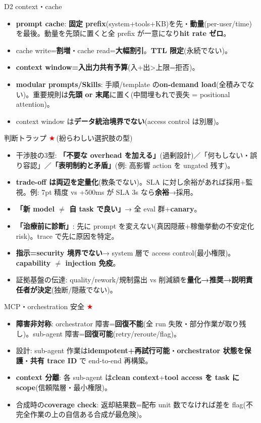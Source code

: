 \documentclass[10pt,a4paper]{article}
\newcommand{\R}[1]{\textcolor{cred}{\textbf{#1}}}
\newcommand{\B}[1]{\textcolor{cblue}{\textbf{#1}}}
\newcommand{\stc}{\textcolor{red}{\ensuremath{\bigstar}}\,}
\begin{document}
\begin{minipage}[t]{0.333\textwidth}

\begin{boxblue}{D2 context・cache}
\begin{itemize}
\item \R{prompt cache}: \B{固定 prefix}(system+tools+KB)を先・\B{動量}(per-user/time)を最後。動量を先頭に置くと全 prefix が一意になり\B{hit rate ゼロ}。
\item cache write=\B{割増}・cache read=\B{大幅割引}。\B{TTL 限定}(永続でない)。
\item \R{context window=入出力共有予算}(入+出>上限=拒否)。
\item \R{modular prompts/Skills}: 手順/template の\B{on-demand load}(全積みでない)。重要規則は\B{先頭 or 末尾}に置く(中間埋もれで喪失 = positional attention)。
\item context window は\B{データ統治境界でない}(access control は別層)。
\end{itemize}
\end{boxblue}

\begin{boxamber}{判断トラップ \stc (紛らわしい選択肢の型)}
\begin{itemize}
\item 干渉肢の3型: \R{「不要な overhead を加える」}(過剰設計)／「何もしない・誤り容認」／\R{「表明制約と矛盾」}(例: 高影響 action を ungated 残す)。
\item \R{trade-off は両辺を定量化}(教条でない)。SLA に対し余裕があれば採用+監視。例: 7pt 精度 vs +500ms が SLA 3s なら\B{余裕}→採用。
\item \R{「新 model $\neq$ 自 task で良い」}→ 全 eval 群+\B{canary}。
\item \R{「治療前に診断」}: 先に prompt を変えない(真因隠蔽+稼働挙動の不安定化 risk)。trace で先に原因を特定。
\item \R{指示=security 境界でない}→ system 層で access control(最小権限)。\B{capability $\neq$ injection 免疫}。
\item 証拠基盤の伝達: quality/rework/規制露出 vs 削減額を\B{量化→推奨→説明責任者が決定}(独断/隠蔽でない)。
\end{itemize}
\end{boxamber}

\begin{boxamber}{MCP・orchestration 安全 \stc}
\begin{itemize}
\item \R{障害非対称}: orchestrator 障害=\B{回復不能}(全 run 失敗・部分作業が取り残し)。sub-agent 障害=\B{回復可能}(retry/reroute/flag)。
\item 設計: sub-agent 作業は\B{idempotent+再試行可能}・\B{orchestrator 状態を保護}・\B{共有 trace ID} で end-to-end 再構築。
\item \R{context 分離}: 各 sub-agent は\B{clean context}+\B{tool access を task に scope}(信頼階層・最小権限)。
\item 合成時の\B{coverage check}: 返却結果数=配布 unit 数でなければ差を flag(不完全作業の上の自信ある合成が最危険)。
\end{itemize}
\end{boxamber}

\end{minipage}
\end{document}
